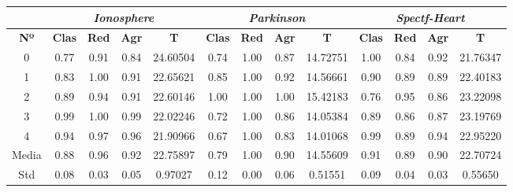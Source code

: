 \documentclass[10pt, a4paper]{article}
\theoremstyle{theorem-style}
\theoremstyle{theorem-style}
\theoremstyle{theorem2-style}
\theoremstyle{definition-style}
\theoremstyle{remark-style}
\theoremstyle{example-style}
\theoremstyle{definition-style}
\theoremstyle{remark-style}
\theoremstyle{remark-style}
\begin{document}
\begin{table}[ht!]
\begin{tabular}{ccccc|cccc|cccc}
\centering
 & \multicolumn{4}{c}{\textit{Ionosphere}} & \multicolumn{4}{c}{\textit{Parkinson}} & \multicolumn{4}{c}{\textit{Spectf-Heart}} \\ \hline
\textbf{Nº} & \textbf{Clas} & \textbf{Red} & \textbf{Agr} & \textbf{T} & \textbf{Clas} & \textbf{Red} & \textbf{Agr} & \textbf{T} & \textbf{Clas} & \textbf{Red} & \textbf{Agr} & \textbf{T} \\ \hline
0&	 0.77 & 0.91 & 0.84 & 24.60504 & 	0.74 & 1.00 & 0.87 & 14.72751 & 1.00 & 0.84 & 0.92 & 21.76347 \\ 
1&	 0.83 & 1.00 & 0.91 & 22.65621 & 	0.85 & 1.00 & 0.92 & 14.56661 & 0.90 & 0.89 & 0.89 & 22.40183 \\ 
2&	 0.89 & 0.94 & 0.91 & 22.60146 & 	1.00 & 1.00 & 1.00 & 15.42183 & 0.76 & 0.95 & 0.86 & 23.22098 \\ 
3&	 0.99 & 1.00 & 0.99 & 22.02246 & 	0.72 & 1.00 & 0.86 & 14.05384 & 0.89 & 0.86 & 0.87 & 23.19769 \\ 
4&	 0.94 & 0.97 & 0.96 & 21.90966 & 	0.67 & 1.00 & 0.83 & 14.01068 & 0.99 & 0.89 & 0.94 & 22.95220 \\ 
\hline
Media&	 0.88 & 0.96 & 0.92 & 22.75897 &	0.79 & 1.00 & 0.90 & 14.55609 &		0.91 & 0.89 & 0.90 & 22.70724
 \\ Std&	 0.08 & 0.03 & 0.05 & 0.97027	& 0.12 & 0.00 & 0.06 & 0.51551	&	0.09 & 0.04 & 0.03 & 0.55650\\

\end{tabular}
\end{table}

\pagebreak
\end{document}
